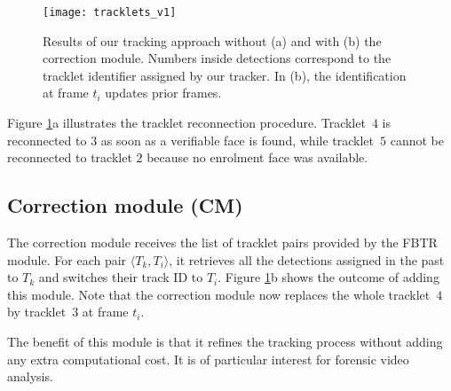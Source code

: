\begin{figure}[t]
\texttt{[image: tracklets\_v1]}

\caption{Results of our tracking approach without (a) and with (b) the correction module. Numbers inside detections correspond to the tracklet identifier assigned by our tracker. In (b), the identification at frame $t_{i}$ updates prior frames.}
\label{fig:reid_tracklets}
\end{figure}

Figure \ref{fig:reid_tracklets}a illustrates the tracklet reconnection procedure. Tracklet~$4$ is reconnected to $3$ as soon as a verifiable face is found, while tracklet~$5$ cannot be reconnected to tracklet $2$ because no enrolment face was available.


\subsection{Correction module (CM)}

The correction module receives the list of tracklet pairs provided by the FBTR module. For each pair $\langle T_k, T_i\rangle$, it retrieves all the detections assigned in the past to $T_k$ and switches their track ID to $T_i$. Figure \ref{fig:reid_tracklets}b shows the outcome of adding this module. Note that the correction module now replaces the whole tracklet~$4$ by tracklet~$3$ at frame $t_i$.

The benefit of this module is that it refines the tracking process without adding any extra computational cost. It is of particular interest for forensic video analysis.


